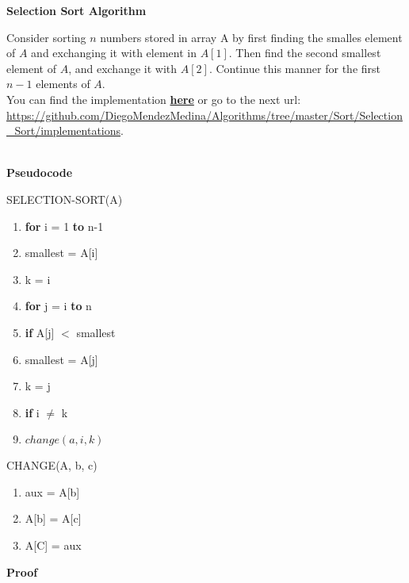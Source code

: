 \documentclass[12pt, twoside, a4paper]{article}
\begin{document}
\begin{center}
  {\large \bfseries Selection Sort Algorithm \par}
\end{center}
Consider sorting $n$ numbers stored in array A by first finding the smalles element of $A$ and exchanging it with element in $A[1]$. Then find the second
smallest element of $A$, and exchange it with $A[2]$. Continue this manner
 for the first $n-1$ elements of $A$.\\
 You can find the implementation \href{https://github.com/DiegoMendezMedina/Algorithms/tree/master/Sort/Selection_Sort/implementations}{\textbf{here}}
 or go to the next url: \url{https://github.com/DiegoMendezMedina/Algorithms/tree/master/Sort/Selection_Sort/implementations}. \\ \\
  \begin{center}
    {\large \textbf{Pseudocode} \par}
  \end{center}
  SELECTION-SORT(A)
  \begin{enumerate}
  \item \textbf{for} i = 1 \textbf{to} n-1
  \item \hspace{.5cm} smallest = A[i]
  \item \hspace{.5cm} k = i
  \item \hspace{.5cm} \textbf{for} j = i \textbf{to} n
  \item \hspace{1cm} \textbf{if} A[j] $<$ smallest
  \item \hspace{1.5cm} smallest = A[j]
  \item \hspace{1.5cm} k = j
  \item \hspace{.5cm} \textbf{if} i $\neq$  k
  \item \hspace{1cm} $change(a, i, k)$
  \end{enumerate}
  CHANGE(A, b, c)
  \begin{enumerate}
  \item aux = A[b]
  \item A[b] = A[c]
  \item A[C] = aux
  \end{enumerate}
  \newpage
  \begin{center}
        {\large \textbf{Proof} \par}
  \end{center}
\end{document}
